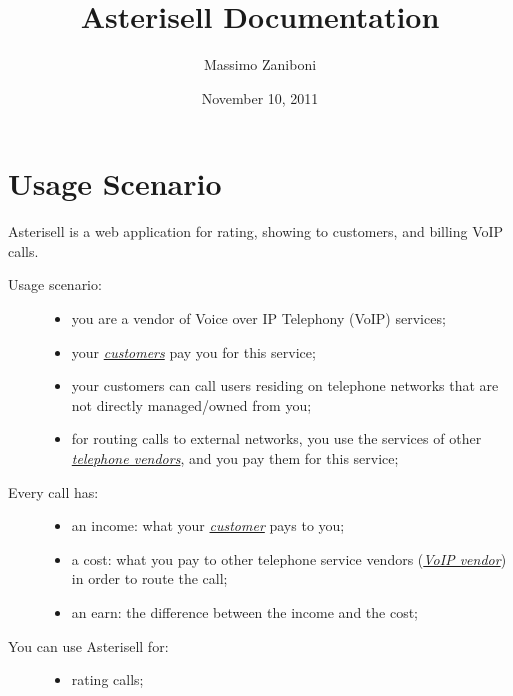 \documentclass[letterpaper,10pt,english]{sphinxmanual}
\title{Asterisell Documentation}
\date{November 10, 2011}
\author{Massimo Zaniboni}
\begin{document}
\maketitle
\tableofcontents
{}\label{index::doc}



\chapter{Usage Scenario}
\label{index:asterisell-overview}\label{index:usage-scenario}
Asterisell is a web application for rating, showing to customers, and billing VoIP calls.
\begin{description}
\item[{Usage scenario:}] \leavevmode\begin{itemize}
\item {} 
you are a vendor of Voice over IP Telephony (VoIP) services;

\item {} 
your {\hyperref[index:term-customer]{\emph{customers}}} pay you for this service;

\item {} 
your customers can call users residing on telephone networks that are not directly managed/owned from you;

\item {} 
for routing calls to external networks, you use the services of other {\hyperref[index:term-voip-vendor]{\emph{telephone vendors}}}, and you pay them for this service;

\end{itemize}

\item[{Every call has:}] \leavevmode\begin{itemize}
\item {} 
an income: what your {\hyperref[index:term-customer]{\emph{customer}}} pays to you;

\item {} 
a cost: what you pay to other telephone service vendors ({\hyperref[index:term-voip-vendor]{\emph{VoIP vendor}}}) in order to route the call;

\item {} 
an earn: the difference between the income and the cost;

\end{itemize}

\item[{You can use Asterisell for:}] \leavevmode\begin{itemize}
\item {} 
rating calls;


\end{itemize}
\end{description}
\end{document}
